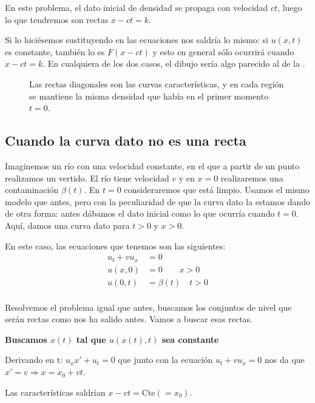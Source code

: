 			En este problema, el dato inicial de densidad se propaga con velocidad $ct$, luego lo que tendremos son rectas $x - ct = k$.

			Si lo hiciésemos sustituyendo en las ecuaciones nos saldría lo mismo: si $u(x,t)$ es constante, también lo es $F(x-ct)$ y esto en general sólo ocurrirá cuando $x - ct = k$. En cualquiera de los dos casos, el dibujo sería algo parecido al de la .

			\begin{figure}
			\centering
			\caption{Las rectas diagonales son las curvas características, y en cada región se mantiene la misma densidad que había en el primer momento $t = 0$.}
			\label{fig:ConjNivelCochesSimple}
			\end{figure}



	\subsection{Cuando la curva dato no es una recta}

		Imaginemos un río con una velocidad constante, en el que a partir de un punto realizamos un vertido. El río tiene velocidad $v$ y en $x=0$ realizaremos una contaminación $\beta(t)$. En $t=0$ consideraremos que está limpio. Usamos el mismo modelo que antes, pero con la peculiaridad de que la curva dato la estamos dando de otra forma: antes dábamos el dato inicial como lo que ocurría cuando $t = 0$. Aquí, damos una curva dato para $t > 0$ y $x > 0$.

		En este caso, las ecuaciones que tenemos son las siguientes:
		\begin{align*}
		u_t + vu_x &= 0 \\
		u(x,0) &= 0 \qquad x>0 \\
		u(0,t) &= \beta(t)\quad t>0 \\
		\end{align*}

		Resolvemos el problema igual que antes, buscamos los conjuntos de nivel que serán rectas como nos ha salido antes. Vamos a buscar esas rectas.

		\textbf{Buscamos $x(t)$ tal que $u(x(t),t)$ sea constante}

		Derivando en t: $u_x x' + u_t = 0$ que junto con la ecuación $u_t + v u_x = 0$ nos da que $x' = v \Rightarrow x = x_0 + vt $.

		Las características saldrían \(x-vt = \text{Cte}(=x_0) \label{eq:rio_vcte}\).

